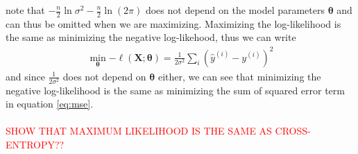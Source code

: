note that $-\frac{n}{2} \ln \sigma^{2}-\frac{n}{2} \ln (2 \pi)$ does not depend on the model parameters $\boldsymbol{\theta}$ and can thus be omitted when we are maximizing. Maximizing the log-likelihood is the same as minimizing the negative log-likehood, thus we can write 
\begin{equation*}
\begin{split}
        \min_{\boldsymbol{\boldsymbol{\theta}}}{- \ell(\mathbf{X};\boldsymbol{\theta})}=\frac{1}{2 \sigma^{2}} \sum_{i}\left(\hat{y}^{(i)}-y^{(i)}\right)^{2}
\end{split}
\end{equation*}
and since $\frac{1}{2 \sigma^{2}}$ does not depend on $\boldsymbol{\theta}$ either, we can see that minimizing the negative log-likelihood is the same as minimizing the sum of squared error term in equation \ref{eq:mse}.\\
\\
\textcolor{red}{SHOW THAT MAXIMUM LIKELIHOOD IS THE SAME AS CROSS-ENTROPY??}



